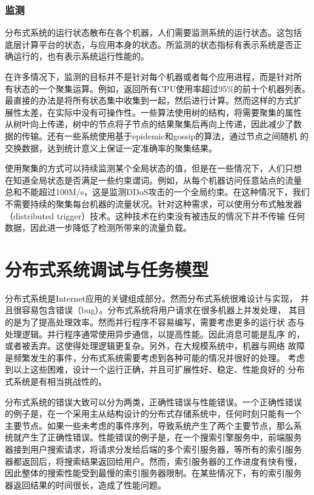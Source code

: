 \subsubsection*{监测}

分布式系统的运行状态散布在各个机器，人们需要监测系统的运行状态。这包括
底层计算平台的状态，与应用本身的状态。所监测的状态指标有表示系统是否正
确运行的，也有表示系统运行性能的。

在许多情况下，监测的目标并不是针对每个机器或者每个应用进程，而是针对所
有状态的一个聚集运算。例如，返回所有CPU使用率超过95\%的前十个机器列表。
最直接的办法是将所有状态集中收集到一起，然后进行计算。然而这样的方式扩
展性太差，在实际中没有可操作性。一些算法使用树的结构，将需要聚集的属性
从树叶向上传递，树中的节点将子节点的结果聚集后再向上传递，因此减少了数
据的传输。还有一些系统使用基于epidemic和gossip的算法，通过节点之间随机
的交换数据，达到统计意义上保证一定准确率的聚集结果。

使用聚集的方式可以持续监测某个全局状态的值，但是在一些情况下，人们只想
在知道全局状态是否满足一些约束谓词。例如，从每个机器访问任意站点的流量
总和不能超过100M/s，这是监测DDoS攻击的一个全局约束。在这种情况下，我们
不需要持续的聚集每台机器的流量状况。针对这种需求，可以使用分布式触发器
（distributed trigger）技术。这种技术在约束没有被违反的情况下并不传输
任何数据，因此进一步降低了检测所带来的流量负载。

\section{分布式系统调试与任务模型}

分布式系统是Internet应用的关键组成部分。然而分布式系统很难设计与实现，
并且很容易包含错误（bug）。分布式系统将用户请求在很多机器上并发处理，
其目的是为了提高处理效率。然而并行程序不容易编写，需要考虑更多的运行状
态与处理逻辑。并行程序通常使用异步通信，以提高性能。因此消息可能是乱序
的，或者被丢弃。这使得处理逻辑更复杂。另外，在大规模系统中，机器与网络
故障是频繁发生的事件，分布式系统需要考虑到各种可能的情况并很好的处理。
考虑到以上这些困难，设计一个运行正确，并且可扩展性好、稳定、性能良好的
分布式系统是有相当挑战性的。

分布式系统的错误大致可以分为两类，正确性错误与性能错误。一个正确性错误
的例子是，在一个采用主从结构设计的分布式存储系统中，任何时刻只能有一个
主要节点。如果一些未考虑的事件序列，导致系统产生了两个主要节点，那么系
统就产生了正确性错误。性能错误的例子是，在一个搜索引擎服务中，前端服务
器接到用户搜索请求，将请求分发给后端的多个索引服务器，等所有的索引服务
器都返回后，将搜索结果返回给用户。然而，索引服务器的工作进度有快有慢，
因此整体的搜索性能受到最慢的索引服务器限制。在某些情况下，有的索引服务
器返回结果的时间很长，造成了性能问题。

